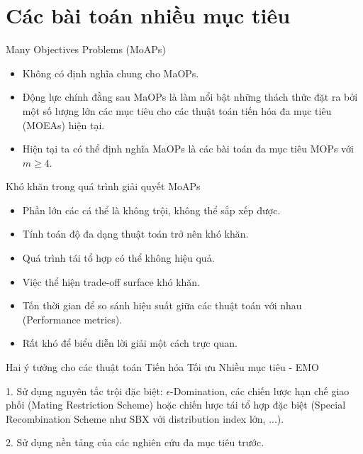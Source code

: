 \documentclass{beamer}
\begin{document}

\section{Các bài toán nhiều mục tiêu}

    \begin{frame}{Many Objectives Problems (MoAPs)}
        \begin{itemize}
            \item <1-> Không có định nghĩa chung cho MaOPs.
            \item <2-> Động lực chính đằng sau MaOPs là làm nổi bật những thách thức đặt ra bởi một số lượng lớn các mục tiêu cho các thuật toán tiến hóa đa mục tiêu (MOEAs) hiện tại.
            \item <3-> Hiện tại ta có thể định nghĩa MaOPs là các bài toán đa mục tiêu MOPs với $m \geq 4$.
        \end{itemize}
    \end{frame}

    \begin{frame}{Khó khăn trong quá trình giải quyết MoAPs}
        \begin{itemize}
            \item <1-> Phần lớn các cá thể là không trội, không thể sắp xếp được.
            \item <2-> Tính toán độ đa dạng thuật toán trở nên khó khăn.
            \item <3-> Quá trình tái tổ hợp có thể không hiệu quả.
            \item <4-> Việc thể hiện trade-off surface khó khăn.
            \item <5-> Tốn thời gian để so sánh hiệu suất giữa các thuật toán với nhau (Performance metrics).
            \item <6-> Rất khó để biểu diễn lời giải một cách trực quan.
        \end{itemize}
    \end{frame}

    \begin{frame}{Hai ý tưởng cho các thuật toán Tiến hóa Tối ưu Nhiều mục tiêu - EMO}
        \begin{block}{1.}
            Sử dụng nguyên tắc trội đặc biệt: $ \epsilon $-Domination, các chiến lược hạn chế giao phối (Mating Restriction Scheme)
            hoặc chiến lược tái tổ hợp đặc biệt (Special Recombination Scheme như SBX với distribution index lớn, ...).
        \end{block}
        \pause
        \begin{block}{2.}
            Sử dụng nền tảng của các nghiên cứu đa mục tiêu trước.
        \end{block}
    \end{frame}
\end{document}

